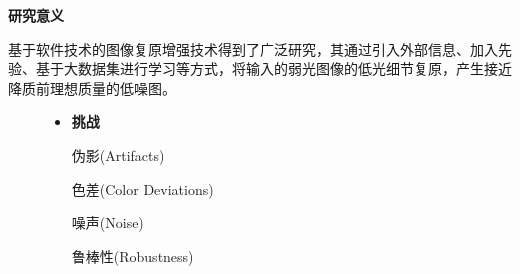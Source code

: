 \documentclass[CJK,aspectratio=169]{beamer}  %
\begin{document}
	\begin{frame}
		{ \yahei \textbf{研究意义}}
		
		\vspace{0.1cm}
		
		{ \yahei 基于软件技术的图像复原增强技术得到了广泛研究，其通过引入外部信息、加入先验、基于大数据集进行学习等方式，将输入的弱光图像的低光细节复原，产生接近降质前理想质量的低噪图。}

		\begin{figure}
			\centering			
			\begin{minipage}{.4\columnwidth}
				\begin{itemize} 
					\item {} \yahei \textbf{挑战}
					
					 \yahei 伪影(Artifacts)
					
					 \yahei 色差(Color Deviations) 
					
					 \yahei 噪声(Noise)
					
					 \yahei 鲁棒性(Robustness)
					

\end{itemize}
\end{minipage}
\end{figure}
\end{frame}
\end{document}
